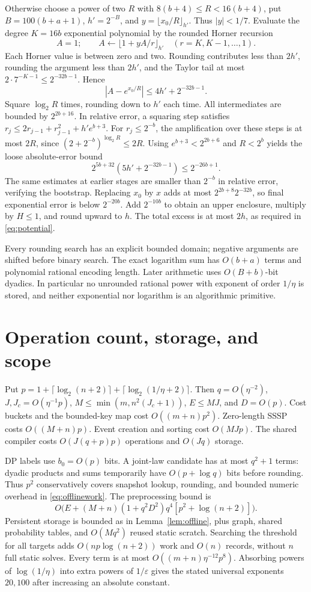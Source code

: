 \documentclass[acmsmall,11pt,screen,nonacm]{acmart}
\newcommand{\floorg}[2]{\lfloor #1\rfloor_{#2}}
\begin{document}
Otherwise choose a power of two $R$ with $8(b+4)\le R<16(b+4)$, put $B=100(b+a+1)$, $h'=2^{-B}$, and $y=\floorg{x_0/R}{h'}$. Thus $|y|<1/7$. Evaluate the degree $K=16b$ exponential polynomial by the rounded Horner recursion
\[
 A=1;\qquad A\leftarrow\floorg{1+yA/r}{h'}\quad(r=K,K-1,\ldots,1).
\]
Each Horner value is between zero and two. Rounding contributes less than $2h'$, rounding the argument less than $2h'$, and the Taylor tail at most $2\cdot7^{-K-1}\le2^{-32b-1}$. Hence
\[
 |A-e^{x_0/R}|\le4h'+2^{-32b-1}.
\]
Square $\log_2R$ times, rounding down to $h'$ each time. All intermediates are bounded by $2^{2b+16}$. In relative error, a squaring step satisfies
$r_j\le2r_{j-1}+r_{j-1}^2+h'e^{b+3}$.
For $r_j\le2^{-b}$, the amplification over these steps is at most $2R$, since $(2+2^{-b})^{\log_2R}\le2R$. Using $e^{b+3}<2^{2b+6}$ and $R<2^b$ yields the loose absolute-error bound
\[
 2^{5b+32}(5h'+2^{-32b-1})\le2^{-26b+1}.
\]
The same estimates at earlier stages are smaller than $2^{-b}$ in relative error, verifying the bootstrap. Replacing $x_0$ by $x$ adds at most $2^{2b+8}2^{-32b}$, so final exponential error is below $2^{-20b}$. Add $2^{-10b}$ to obtain an upper enclosure, multiply by $H\le1$, and round upward to $h$. The total excess is at most $2h$, as required in \eqref{eq:potential}.

Every rounding search has an explicit bounded domain; negative arguments are shifted before binary search. The exact logarithm sum has $O(b+a)$ terms and polynomial rational encoding length. Later arithmetic uses $O(B+b)$-bit dyadics. In particular no unrounded rational power with exponent of order $1/\eta$ is stored, and neither exponential nor logarithm is an algorithmic primitive.

\section{Operation count, storage, and scope}\label{sec:resources}
Put $p=1+\lceil\log_2(n+2)\rceil+\lceil\log_2(1/\eta+2)\rceil$. Then $q=O(\eta^{-2})$, $J,J_c=O(\eta^{-1}p)$, $M\le\min(m,n^2(J_c+1))$, $E\le MJ$, and $D=O(p)$. Cost buckets and the bounded-key map cost $O((m+n)p^2)$. Zero-length SSSP costs $O((M+n)p)$. Event creation and sorting cost $O(MJp)$. The shared compiler costs $O(J(q+p)p)$ operations and $O(Jq)$ storage.

DP labels use $b_0=O(p)$ bits. A joint-law candidate has at most $q^2+1$ terms: dyadic products and sums temporarily have $O(p+\log q)$ bits before rounding. Thus $p^2$ conservatively covers snapshot lookup, rounding, and bounded numeric overhead in \eqref{eq:offlinework}. The preprocessing bound is
\[
 O\big(E+(M+n)(1+q^2D^2)q^4[p^2+\log(n+2)]\big).
\]
Persistent storage is bounded as in Lemma~\ref{lem:offline}, plus graph, shared probability tables, and $O(Mq^2)$ reused static scratch. Searching the threshold for all targets adds $O(np\log(n+2))$ work and $O(n)$ records, without $n$ full static solves. Every term is at most $O((m+n)\eta^{-12}p^8)$. Absorbing powers of $\log(1/\eta)$ into extra powers of $1/\varepsilon$ gives the stated universal exponents $20,100$ after increasing an absolute constant.
\end{document}

